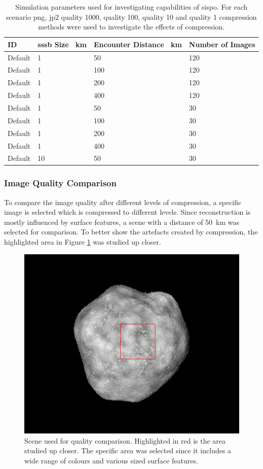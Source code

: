 \begin{table}[htb]
    \centering
    \caption{Simulation parameters used for investigating capabilities of \gls{sispo}. For each scenario \gls{png}, \gls{jp2} quality 1000, quality 100, quality 10 and quality 1 compression methods were used to investigate the effects of compression.}
    \label{tab:sim_params}
    \begin{tabular}{l|lll}
        ID      & \gls{sssb} Size \SI{}{\kilo\meter} & Encounter Distance \SI{}{\kilo\meter} & Number of Images \\ \hline
        Default & 1  & 50  & 120\\
        Default & 1  & 100 & 120\\
        Default & 1  & 200 & 120\\
        Default & 1  & 400 & 120\\
        Default & 1  & 50  & 30\\
        Default & 1  & 100 & 30\\
        Default & 1  & 200 & 30\\
        Default & 1  & 400 & 30\\
        Default & 10 & 50  & 30\\
    \end{tabular}
\end{table}

\subsubsection{Image Quality Comparison}
To compare the image quality after different levels of compression, a specific image is selected which is compressed to different levels. Since reconstruction is mostly influenced by surface features, a scene with a distance of \SI{50}{\kilo\meter} was selected for comparison. To better show the artefacts created by compression, the highlighted area in Figure \ref{fig:img_quality_frame} was studied up closer.

\begin{figure}[htb]
    \centering
    \includegraphics[width=.7\textwidth]{doc/thesis/0_figures/compare_quality/set1/framed/jp2_1000_frame.png}
    \caption{Scene used for quality comparison. Highlighted in red is the area studied up closer. The specific area was selected since it includes a wide range of colours and various sized surface features.}
    \label{fig:img_quality_frame}
\end{figure}

